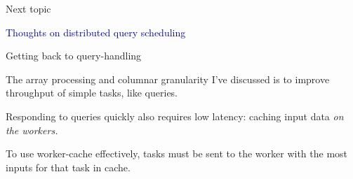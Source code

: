 \documentclass[aspectratio=169]{beamer}
\begin{document}
\begin{frame}{Next topic}
\Large
\vspace{1 cm}
\begin{center}
\textcolor{darkblue}{Thoughts on distributed query scheduling}
\end{center}
\end{frame}

\begin{frame}{Getting back to query-handling}
\large
\vspace{0.5 cm}
\begin{center}
\begin{minipage}{0.75\linewidth}
\begin{center}
The array processing and columnar granularity I've discussed is to improve throughput of simple tasks, like queries.

\vspace{0.75 cm}
Responding to queries quickly also requires low latency: caching input data {\it on the workers.}

\vspace{0.75 cm}
To use worker-cache effectively, tasks must be sent to the worker with the most inputs for that task in cache.
\end{center}
\end{minipage}
\end{center}
\end{frame}
\end{document}
